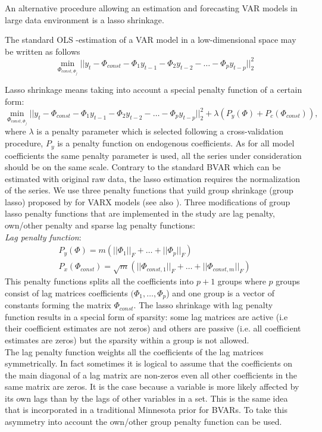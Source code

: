 \documentclass[12pt]{article} %
\begin{document}
An alternative procedure allowing an estimation and forecasting VAR models in large data environment is a lasso shrinkage. 

The standard OLS -estimation of a VAR model in a low-dimensional space may be written as follows
\begin{equation}
\min_{\Phi_{const, \Phi_j}} ||y_t -\Phi_{const}- \Phi_1 y_{t-1} - \Phi_2 y_{t-2} -\ldots - \Phi_p y_{t-p}||^2_2
\end{equation}

Lasso shrinkage means taking into account a special penalty function of a certain form:
 \begin{equation}
\min_{\Phi_{const, \Phi_j}} ||y_t -\Phi_{const}- \Phi_1 y_{t-1} - \Phi_2 y_{t-2} -\ldots - \Phi_p y_{t-p}||^2_2 +\lambda \left(P_y(\Phi)+P_c(\Phi_{const}) \right),
\end{equation} 
where $\lambda$ is a penalty parameter which is selected following a cross-validation procedure, $P_y$ is a penalty function on endogenous coefficients. As for all model coefficients the same penalty parameter is used, all the series under consideration should be on the same scale. Contrary to the standard BVAR which can be estimated with original raw data, the lasso estimation requires the normalization of the series.
We use three penalty functions that yuild group shrinkage (group lasso) proposed by   \autocite{yuan_lin_2006} for VARX models (see also \autocite{nicholson_al_2017}). 
Three modifications of group lasso penalty functions that are implemented in the study are lag   penalty, own/other penalty and sparse lag penalty functions: \\
\textit{Lag penalty function}:  
\begin{gather}
P_y(\Phi) = m \left( ||\Phi_1||_{F}+\ldots + ||\Phi_p||_{F} \right) \\
P_x(\Phi_{const})= \sqrt{m}  \left( ||\Phi_{const,1}||_{F}+\ldots + ||\Phi_{const,m}||_{F} \right)
\end{gather}
 This penalty functions splits all the coefficients into $p+1$ groups where $p$ groups consist of lag matrices coefficients $(\Phi_1,\ldots, \Phi_p$) and one group is a vector of constants forming the matrix $\Phi_{const}$.
The lasso shrinkage with lag penalty function results in a special form of sparsity: some lag matrices are active (i.e their coefficient estimates are not zeros) and others are passive (i.e. all coefficient estimates are zeros) but the sparsity within a group is not allowed.\\
The lag penalty function weights all the coefficients of the lag matrices symmetrically. In fact sometimes it is logical to assume that the coefficients on the main diagonal of a lag matrix are non-zeros even all other coefficients in the same matrix are zeros. It is the case because a variable is more likely affected by its own lags than by the lags of other variables in a set. This  is the same idea that is incorporated in a traditional Minnesota prior for BVARs. To take this asymmetry into account the own/other group penalty function can be used. \\
\end{document}
